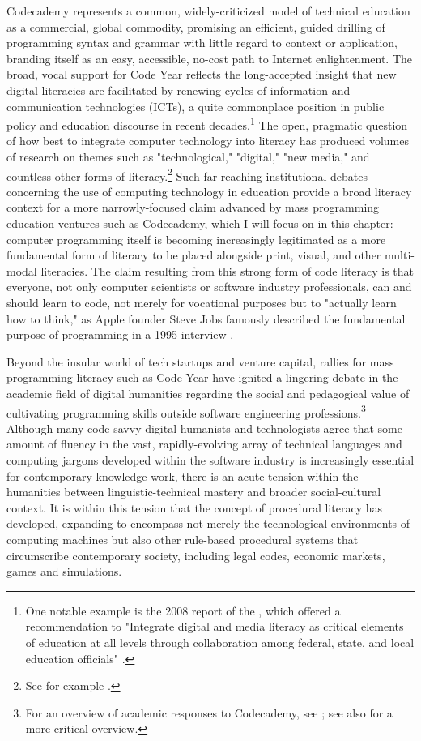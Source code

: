 Codecademy represents a common, widely-criticized model of technical education as a commercial, global commodity, promising an efficient, guided drilling of programming syntax and grammar with little regard to context or application, branding itself as an easy, accessible, no-cost path to Internet enlightenment. The broad, vocal support for Code Year reflects the long-accepted insight that new digital literacies are facilitated by renewing cycles of information and communication technologies (ICTs), a quite commonplace position in public policy and education discourse in recent decades.\footnote{
  One notable example is the 2008 report of the \citeauthor{Knight09}, which offered a recommendation to "Integrate digital and media literacy as critical elements of education at all levels through collaboration among federal, state, and local education officials" \autocite[45]{Knight09}.
} The open, pragmatic question of how best to integrate computer technology into literacy has produced volumes of research on themes such as "technological," "digital," "new media," and countless other forms of literacy.\footnote{
  See for example \autocites{Dakers2006}{Jones2005}.
} Such far-reaching institutional debates concerning the use of computing technology in education provide a broad literacy context for a more narrowly-focused claim advanced by mass programming education ventures such as Codecademy, which I will focus on in this chapter: computer programming itself is becoming increasingly legitimated as a more fundamental form of literacy to be placed alongside print, visual, and other multi-modal literacies. The claim resulting from this strong form of code literacy is that everyone, not only computer scientists or software industry professionals, can and should learn to code, not merely for vocational purposes but to "actually learn how to think," as Apple founder Steve Jobs famously described the fundamental purpose of programming in a 1995 interview \autocite*{Jobs1995}.

Beyond the insular world of tech startups and venture capital, rallies for mass programming literacy such as Code Year have ignited a lingering debate in the academic field of digital humanities regarding the social and pedagogical value of cultivating programming skills outside software engineering professions.\footnote{
  For an overview of academic responses to Codecademy, see \autocites{Widner12}; see also \autocites{Williamson12} for a more critical overview.
}
Although many code-savvy digital humanists and technologists agree that some amount of fluency in the vast, rapidly-evolving array of technical languages and computing jargons developed within the software industry is increasingly essential for contemporary knowledge work, there is an acute tension within the humanities between linguistic-technical mastery and broader social-cultural context. It is within this tension that the concept of procedural literacy has developed, expanding to encompass not merely the technological environments of computing machines but also other rule-based procedural systems that circumscribe contemporary society, including legal codes, economic markets, games and simulations.

